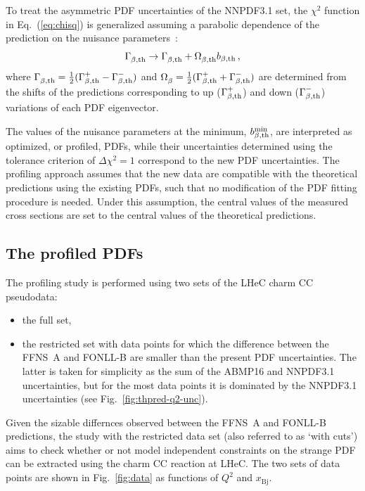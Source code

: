 \documentclass[pdftex,twocolumn,epjc3]{svjour3}          %
\newcommand{\abmp} {ABMP16\xspace}
\newcommand{\nnpdf} {NNPDF3.1\xspace}
\newcommand{\chisq}{\ensuremath{\chi^2}\xspace}
\newcommand{\xbj}{\ensuremath{x_{\text{Bj}}}\xspace}
\newcommand{\fonll} {{FONLL-B}\xspace}
\newcommand{\ffns} {{FFNS~A}\xspace}
\newcommand\new[1]{{\color{blue} #1}}
\begin{document}
To treat the asymmetric PDF uncertainties of the \nnpdf set, the
\chisq function in Eq.~(\ref{eq:chisq}) is generalized assuming a
parabolic dependence of the prediction on the nuisance
parameters~\cite{Alekhin:2014irh}:
\begin{eqnarray}
\Gamma^{}_{\beta, \rm th} \to \Gamma^{}_{\beta, \rm th} +  \Omega^{}_{\beta, \rm th}b_{\beta, \rm th}\,, \label{eq:iter}
\end{eqnarray}
where
$\Gamma^{}_{\beta, \rm th} = \frac12(\Gamma^{+}_{\beta, \rm th} -
\Gamma^{-}_{\beta, \rm th})$
and
$\Omega^{}_{\beta} = \frac12 (\Gamma^{+}_{\beta, \rm th} +
\Gamma^{-}_{\beta, \rm th})$
are determined from the shifts of the predictions corresponding to up
($\Gamma^{+}_{\beta, \rm th}$) and down
($ \Gamma^{-}_{\beta, \rm th}$) variations of each PDF eigenvector.

The values of the nuisance parameters at the minimum,
$b^{\rm min}_{\beta,\rm th}$, are interpreted as optimized, or
profiled, PDFs, while their uncertainties determined using the
tolerance criterion of $\Delta\chi^2 = 1$ correspond to the new PDF
uncertainties. The profiling approach assumes that the new data are
compatible with the theoretical predictions using the existing PDFs,
such that no modification of the PDF fitting procedure is
needed. Under this assumption, the central values of the measured
cross sections are set to the central values of the theoretical
predictions.


\subsection{The profiled PDFs}
\label{sec:profile}

\new{
The profiling study is performed using two sets of the LHeC charm CC pseudodata:
\begin{itemize}
 \item the full set,
 \item the restricted set with data points for which the difference between the \ffns and \fonll are smaller than the present PDF uncertainties. 
 The latter is taken for simplicity as the sum of the \abmp and \nnpdf uncertainties, but for the most data points it is dominated by the \nnpdf uncertainties (see Fig.~\ref{fig:thpred-q2-unc}).
\end{itemize}
Given the sizable differnces observed between the \ffns and \fonll predictions, the study with the restricted data set (also referred to as `with cuts') aims to check whether or not model independent constraints on the strange PDF can be extracted using the charm CC reaction at LHeC. The two sets of data points are shown in Fig.~\ref{fig:data} as functions of $Q^2$ and \xbj.
}
\end{document}
